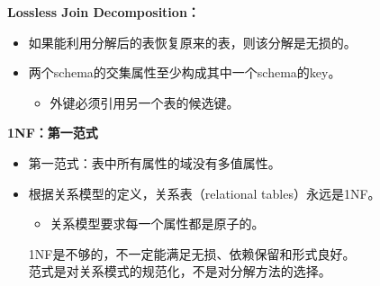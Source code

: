 \documentclass[b5paper, twoside]{article}
\let\oldtextbf\textbf
\renewcommand{\textbf}[1]{\textcolor{myblue}{\oldtextbf{#1}}}
\newenvironment{smallmdframed}
  {\begin{mdframed}[linewidth=0pt, backgroundcolor=pink!20]\small}
  {\end{mdframed}}
\begin{document}
\textbf{Lossless Join Decomposition：} 
\begin{itemize}
    \item 如果能利用分解后的表恢复原来的表，则该分解是无损的。
    \item 两个schema的交集属性至少构成其中一个schema的key。
    \begin{itemize}
        \item 外键必须引用另一个表的候选键。
    \end{itemize}
\end{itemize}

\textbf{1NF：第一范式}
\begin{itemize}
    \item 第一范式：表中所有属性的域没有多值属性。
    \item 根据关系模型的定义，关系表（relational tables）永远是1NF。
    \begin{itemize}
        \item 关系模型要求每一个属性都是原子的。
    \end{itemize}
\begin{smallmdframed}
1NF是不够的，不一定能满足无损、依赖保留和形式良好。
\\ 范式是对关系模式的规范化，不是对分解方法的选择。
\end{smallmdframed}
\end{itemize}
\end{document}
